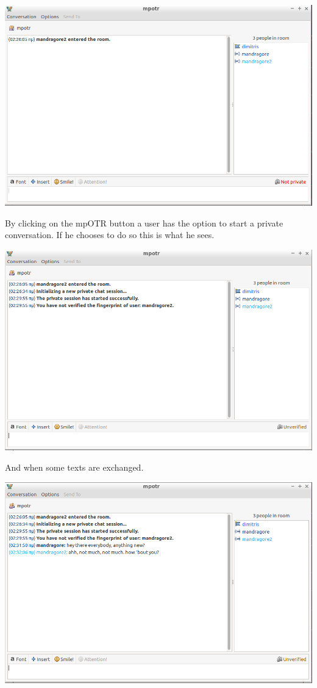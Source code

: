 \documentclass[]{article}
\begin{document}
\includegraphics[scale=0.4]{not_started_unverified.png}

By clicking on the mpOTR button a user has the option to start a private conversation.
If he chooses to do so this is what he sees.

\includegraphics[scale=0.4]{started_unverified.png}

And when some texts are exchanged.

\includegraphics[scale=0.4]{talking_unverified.png}
\end{document}
